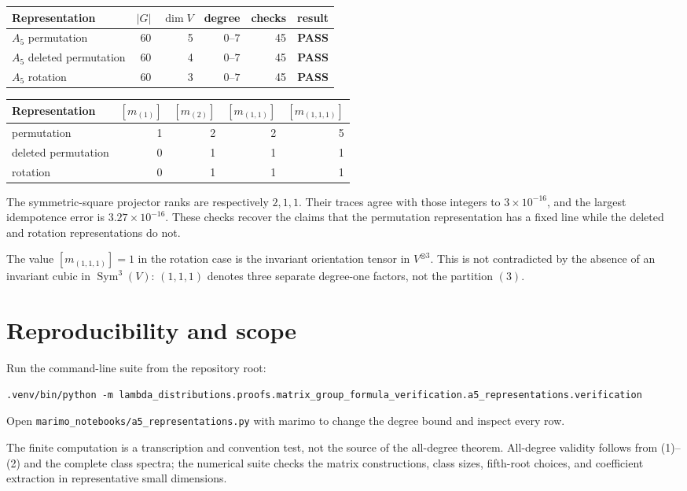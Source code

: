 \documentclass[11pt]{article}
\newcommand{\Sym}{\operatorname{Sym}}
\newcommand{\PASS}{\textcolor{passgreen}{\textbf{PASS}}}
\begin{document}
\begin{center}
\begin{tabularx}{\linewidth}{@{}Xrrrrc@{}}
\toprule
Representation & $|G|$ & $\dim V$ & degree & checks & result\\
\midrule
$A_5$ permutation & 60 & 5 & $0$--$7$ & 45 & \PASS\\
$A_5$ deleted permutation & 60 & 4 & $0$--$7$ & 45 & \PASS\\
$A_5$ rotation & 60 & 3 & $0$--$7$ & 45 & \PASS\\
\bottomrule
\end{tabularx}
\end{center}

\begin{center}
\begin{tabular}{@{}lrrrr@{}}
\toprule
Representation & $[m_{(1)}]$ & $[m_{(2)}]$ & $[m_{(1,1)}]$ & $[m_{(1,1,1)}]$\\
\midrule
permutation & 1 & 2 & 2 & 5\\
deleted permutation & 0 & 1 & 1 & 1\\
rotation & 0 & 1 & 1 & 1\\
\bottomrule
\end{tabular}
\end{center}

The symmetric-square projector ranks are respectively $2,1,1$.  Their traces
agree with those integers to $3\times10^{-16}$, and the largest idempotence
error is $3.27\times10^{-16}$.  These checks recover the claims that the
permutation representation has a fixed line while the deleted and rotation
representations do not.

The value $[m_{(1,1,1)}]=1$ in the rotation case is the invariant orientation
tensor in $V^{\otimes3}$.  This is not contradicted by the absence of an
invariant cubic in $\Sym^3(V)$: $(1,1,1)$ denotes three separate degree-one
factors, not the partition $(3)$.

\section{Reproducibility and scope}

Run the command-line suite from the repository root:
{\scriptsize
\begin{verbatim}
.venv/bin/python -m lambda_distributions.proofs.matrix_group_formula_verification.a5_representations.verification
\end{verbatim}
}
Open \texttt{marimo\_notebooks/a5\_representations.py} with marimo to change the
degree bound and inspect every row.

The finite computation is a transcription and convention test, not the source
of the all-degree theorem.  All-degree validity follows from (1)--(2) and the
complete class spectra; the numerical suite checks the matrix constructions,
class sizes, fifth-root choices, and coefficient extraction in representative
small dimensions.
\end{document}
